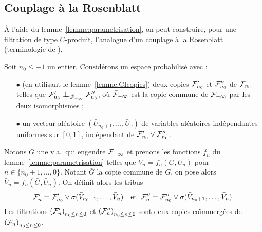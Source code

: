 \documentclass[12pt,a4paper]{article}
\begin{document}
\subsection{Couplage à la Rosenblatt}\label{sec:Rosenblatt}

\`A l'aide du lemme~\ref{lemme:parametrisation}, on 
peut construire, pour une filtration de type 
$C$-produit, l'analogue d'un couplage à la Rosenblatt (terminologie de \cite{LauXLIII}).


Soit $n_0 \leq -1$ un entier. 
Considérons un espace probabilisé avec : 
\begin{itemize}
\item[$\bullet$] (en utilisant le lemme~\ref{lemme:CIcopies}) 
deux copies $\mathcal{F}'_{n_0}$ et $\mathcal{F}''_{n_0}$ de $\mathcal{F}_{n_0}$
 telles que $\FF'_{n_0} \indep_{\bar\FF_{-\infty}} \FF''_{n_0}$, 
 où $\bar{\mathcal{F}}_{-\infty}$ est la copie commune de $\mathcal{F}_{-\infty}$ par les deux 
isomorphismes ;

\item[$\bullet$] un vecteur aléatoire $(\bar U_{n_0+1}, \ldots, \bar U_0)$ 
de variables aléatoires indépendantes uniformes sur $[0,1]$, indépendant 
de $\mathcal{F}'_{n_0} \vee \mathcal{F}''_{n_0}$. 
\end{itemize}

Notons $G$ une v.a.\ qui engendre  $\mathcal{F}_{-\infty}$ et prenons les fonctions $f_n$ du lemme~\ref{lemme:parametrisation} telles que $V_n = f_n(G, U_n)$ 
pour $n \in \{n_0+1, \ldots, 0\}$. 
Notant $\bar G$ la copie commune de $G$, on pose alors 
$\bar V_n = f_n(\bar G, \bar U_n)$. 
On définit alors les tribus 
$$
\mathcal{F}'_n = \mathcal{F}'_{n_0} \vee \sigma(\bar V_{n_0+1}, \ldots, \bar V_n) 
\quad \text{et }\;
\mathcal{F}''_n = \mathcal{F}''_{n_0} \vee \sigma(\bar V_{n_0+1}, \ldots, \bar V_n).  
$$
Les filtrations ${(\mathcal{F}'_n)}_{n_0 \leq n \leq 0}$ et 
${(\mathcal{F}''_n)}_{n_0 \leq n \leq 0}$ sont deux copies co\"immergées de 
${(\mathcal{F}_n)}_{n_0 \leq n \leq 0}$. 
\end{document}
